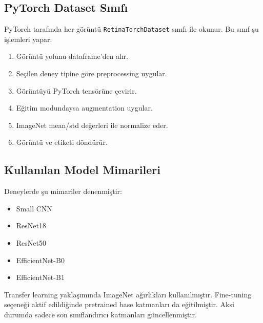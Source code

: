 \documentclass[12pt,a4paper]{article}
\begin{document}


\subsection{PyTorch Dataset Sınıfı}

PyTorch tarafında her görüntü \texttt{RetinaTorchDataset} sınıfı ile okunur. Bu sınıf şu işlemleri yapar:

\begin{enumerate}
    \item Görüntü yolunu dataframe'den alır.
    \item Seçilen deney tipine göre preprocessing uygular.
    \item Görüntüyü PyTorch tensörüne çevirir.
    \item Eğitim modundaysa augmentation uygular.
    \item ImageNet mean/std değerleri ile normalize eder.
    \item Görüntü ve etiketi döndürür.
\end{enumerate}



\subsection{Kullanılan Model Mimarileri}

Deneylerde şu mimariler denenmiştir:

\begin{itemize}
    \item Small CNN
    \item ResNet18
    \item ResNet50
    \item EfficientNet-B0
    \item EfficientNet-B1
\end{itemize}

Transfer learning yaklaşımında ImageNet ağırlıkları kullanılmıştır. Fine-tuning seçeneği aktif edildiğinde pretrained base katmanları da eğitilmiştir. Aksi durumda sadece son sınıflandırıcı katmanları güncellenmiştir.


\end{document}
